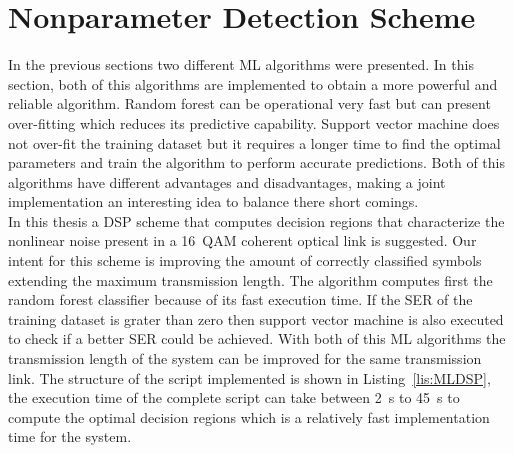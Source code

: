 \section{Nonparameter Detection Scheme  }
In the previous sections two different ML algorithms were presented. In this section, both of this algorithms are implemented to obtain a more powerful and reliable algorithm. Random forest can be operational very fast but can present over-fitting which reduces its predictive capability. Support vector machine does not over-fit the training dataset but it requires a longer time to find the optimal parameters and train the algorithm to perform accurate predictions. Both of this algorithms have different advantages and disadvantages, making a joint implementation an interesting idea to balance there short comings.~\\

In this thesis a DSP scheme that computes decision regions that characterize the nonlinear noise present in a 16~QAM coherent optical link is suggested. Our intent for this scheme is improving the amount of correctly classified symbols extending the maximum transmission length. The algorithm computes first  the random forest classifier because of its fast execution time. If the SER of the training dataset is grater than zero then support vector machine is also executed to check if a better SER could be achieved. With both of this ML algorithms the transmission length of the system can be improved for the same transmission link. The structure of the script implemented is shown in Listing~\ref{lis:MLDSP}, the execution time of the complete script can take between 2~s to 45~s to compute the optimal decision regions which is a relatively fast implementation time for the system.~\\								    

